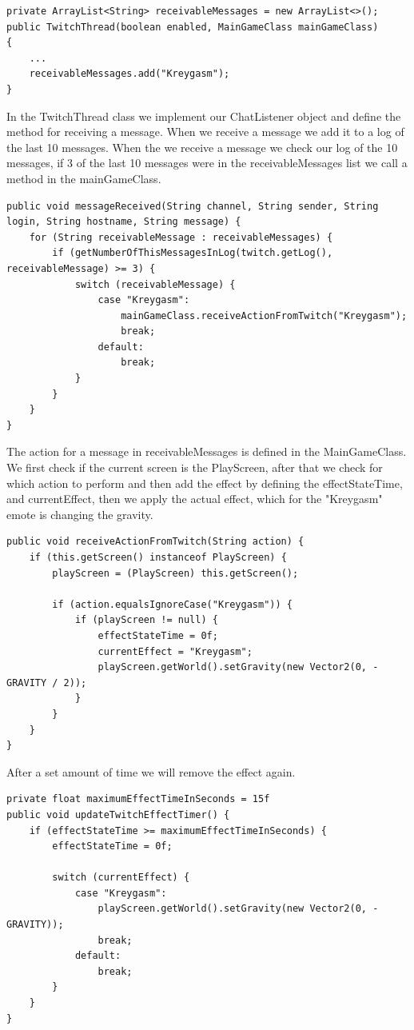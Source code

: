 \documentclass[12p]{article}
\begin{document}
\begin{verbatim}
private ArrayList<String> receivableMessages = new ArrayList<>();
public TwitchThread(boolean enabled, MainGameClass mainGameClass)
{
    ...
    receivableMessages.add("Kreygasm");
}
\end{verbatim}

In the TwitchThread class we implement our ChatListener object and define the method for receiving a message. When we receive a message we add it to a log of the last 10 messages. When the we receive a message we check our log of the 10 messages, if 3 of the last 10 messages were in the receivableMessages list we call a method in the mainGameClass.

\begin{verbatim}
public void messageReceived(String channel, String sender, String login, String hostname, String message) {
    for (String receivableMessage : receivableMessages) {
        if (getNumberOfThisMessagesInLog(twitch.getLog(), receivableMessage) >= 3) {
            switch (receivableMessage) {
                case "Kreygasm":
                    mainGameClass.receiveActionFromTwitch("Kreygasm");
                    break;
                default:
                    break;
            }
        }
    }
}
\end{verbatim}

The action for a message in receivableMessages is defined in the MainGameClass. We first check if the current screen is the PlayScreen, after that we check for which action to perform and then add the effect by defining the effectStateTime, and currentEffect, then we apply the actual effect, which for the "Kreygasm" emote is changing the gravity.

\begin{verbatim}
public void receiveActionFromTwitch(String action) {
	if (this.getScreen() instanceof PlayScreen) {
		playScreen = (PlayScreen) this.getScreen();

		if (action.equalsIgnoreCase("Kreygasm")) {
		    if (playScreen != null) {
		        effectStateTime = 0f;
		        currentEffect = "Kreygasm";
                playScreen.getWorld().setGravity(new Vector2(0, - GRAVITY / 2));
            }
		}
	}
}
\end{verbatim}

After a set amount of time we will remove the effect again.

\begin{verbatim}
private float maximumEffectTimeInSeconds = 15f
public void updateTwitchEffectTimer() {
    if (effectStateTime >= maximumEffectTimeInSeconds) {
        effectStateTime = 0f;

        switch (currentEffect) {
            case "Kreygasm":
                playScreen.getWorld().setGravity(new Vector2(0, - GRAVITY));
                break;
            default:
                break;
        }
    }
}
\end{verbatim}
\end{document}
